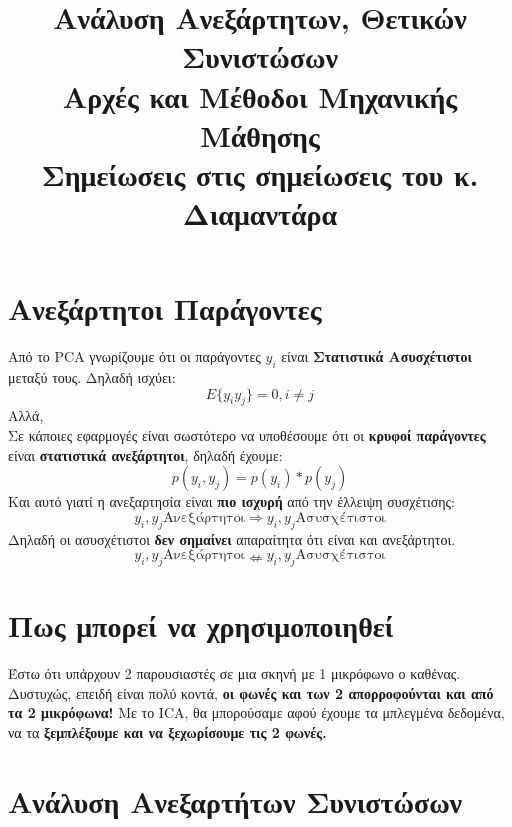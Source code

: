 \documentclass[22pt,a4paper]{article}
\title{%
  \large Ανάλυση Ανεξάρτητων, Θετικών Συνιστώσων \\
  \vspace{5mm}
  \small Αρχές και Μέθοδοι Μηχανικής Μάθησης \\
  \vspace{5mm}
  \footnotesize Σημείωσεις στις σημείωσεις του κ. Διαμαντάρα}
\date{}
\theoremstyle{definition}
\begin{document}
\maketitle

\section*{Ανεξάρτητοι Παράγοντες}

Από το PCA γνωρίζουμε ότι οι παράγοντες $y_i$ είναι \textbf{Στατιστικά Ασυσχέτιστοι} μεταξύ τους. Δηλαδή ισχύει:
\begin{equation}
  \boxed{E \{y_i y_j\} = 0, i \neq j }
\end{equation}
Αλλά, \\
Σε κάποιες εφαρμογές είναι σωστότερο να υποθέσουμε ότι οι \textbf{κρυφοί παράγοντες} είναι \textbf{στατιστικά ανεξάρτητοι}, δηλαδή έχουμε:
\begin{equation}
  \boxed{
    p(y_i,y_j) = p(y_i) * p(y_j)
  }
\end{equation}
Και αυτό γιατί η ανεξαρτησία είναι \textbf{πιο ισχυρή} από την έλλειψη συσχέτισης:
\begin{equation}
  \boxed{
    y_i,y_j \text{Ανεξάρτητοι} \Rightarrow y_i,y_j \text{Ασυσχέτιστοι}
  }
\end{equation}
Δηλαδή οι ασυσχέτιστοι \textbf{δεν σημαίνει} απαραίτητα ότι είναι και ανεξάρτητοι.
\begin{equation}
  \boxed{
    y_i,y_j \text{Ανεξάρτητοι} \nLeftarrow y_i,y_j \text{Ασυσχέτιστοι}
  }
\end{equation}

\section*{Πως μπορεί να χρησιμοποιηθεί}

Έστω ότι υπάρχουν 2 παρουσιαστές σε μια σκηνή με 1 μικρόφωνο ο καθένας.
Δυστυχώς, επειδή είναι πολύ κοντά, \textbf{οι φωνές και των 2 απορροφούνται και από τα 2 μικρόφωνα!} Με το ICA, θα μπορούσαμε αφού έχουμε τα μπλεγμένα δεδομένα, να τα \textbf{ξεμπλέξουμε και να ξεχωρίσουμε τις 2 φωνές.}


\section*{Ανάλυση Ανεξαρτήτων Συνιστώσων}
\end{document}
